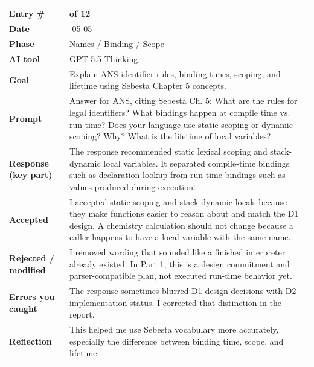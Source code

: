 \documentclass[11pt,a4paper]{article}
\newcommand{\entrygap}{\vspace{8pt}}
\newenvironment{journalentry}{%
  \begin{center}\small\renewcommand{\arraystretch}{1.22}%
  \begin{tabular}{|>{\columncolor{anscodebg}\bfseries}p{3.0cm}|>{\RaggedRight\arraybackslash}p{12.25cm}|}%
  \hline
}{%
  \end{tabular}\end{center}\entrygap
}
\begin{document}
\begin{journalentry}
Entry \# & 7 of 12 \\ \hline
Date & 2026-05-05 \\ \hline
Phase & Names / Binding / Scope \\ \hline
AI tool & GPT-5.5 Thinking \\ \hline
Goal & Explain ANS identifier rules, binding times, scoping, and lifetime using Sebesta Chapter 5 concepts. \\ \hline
Prompt & Answer for ANS, citing Sebesta Ch. 5: What are the rules for legal identifiers? What bindings happen at compile time vs. run time? Does your language use static scoping or dynamic scoping? Why? What is the lifetime of local variables? \\ \hline
Response (key part) & The response recommended static lexical scoping and stack-dynamic local variables. It separated compile-time bindings such as declaration lookup from run-time bindings such as values produced during execution. \\ \hline
Accepted & I accepted static scoping and stack-dynamic locals because they make functions easier to reason about and match the D1 design. A chemistry calculation should not change because a caller happens to have a local variable with the same name. \\ \hline
Rejected / modified & I removed wording that sounded like a finished interpreter already existed. In Part 1, this is a design commitment and parser-compatible plan, not executed run-time behavior yet. \\ \hline
Errors you caught & The response sometimes blurred D1 design decisions with D2 implementation status. I corrected that distinction in the report. \\ \hline
Reflection & This helped me use Sebesta vocabulary more accurately, especially the difference between binding time, scope, and lifetime. \\ \hline
\end{journalentry}
\end{document}
